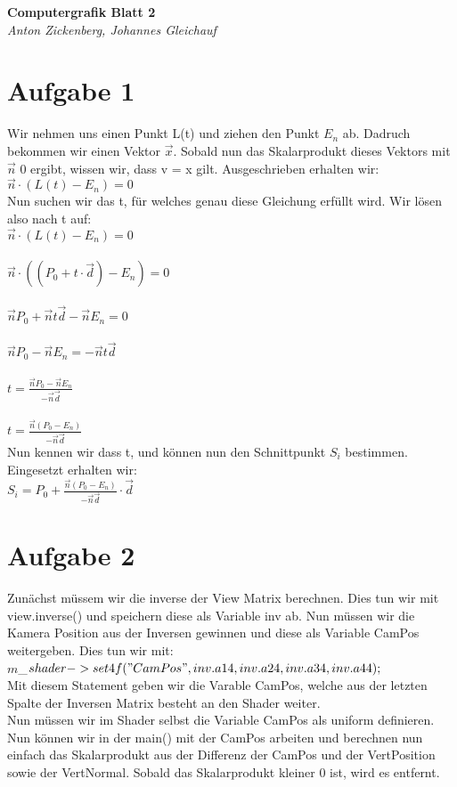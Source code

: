 \documentclass[12pt]{article}
\begin{document}
\begin{center}
 \textbf{\Large Computergrafik Blatt 2}\\
 \emph{Anton Zickenberg, Johannes Gleichauf}
\end{center}

\section*{Aufgabe 1}
Wir nehmen uns einen Punkt L(t) und ziehen den Punkt $E_n$ ab. Dadruch bekommen wir einen Vektor $\overrightarrow{x}$. Sobald nun das Skalarprodukt dieses Vektors mit $\overrightarrow{n}$ 0 ergibt, wissen wir, dass v = x gilt. Ausgeschrieben erhalten wir:\\
$\overrightarrow{n} \cdot (L(t)-E_n) = 0$\\
Nun suchen wir das t, für welches genau diese Gleichung erfüllt wird. Wir lösen also nach t auf:\\
$\overrightarrow{n} \cdot (L(t)-E_n) = 0$\\
\\
$\overrightarrow{n} \cdot ((P_0 + t \cdot \overrightarrow{d})-E_n) = 0$\\
\\
$ \overrightarrow{n}P_0 + \overrightarrow{n}t\overrightarrow{d}-\overrightarrow{n}E_n = 0$\\
\\
$\overrightarrow{n}P_0 -\overrightarrow{n}E_n = -\overrightarrow{n}t\overrightarrow{d}$\\
\\
$t = \frac{\overrightarrow{n}P_0 - \overrightarrow{n}E_n}{-\overrightarrow{n}\overrightarrow{d}}$\\
\\
$t = \frac{\overrightarrow{n}(P_0 - E_n)}{-\overrightarrow{n}\overrightarrow{d}}$\\
Nun kennen wir dass t, und können nun den Schnittpunkt $S_i$ bestimmen. Eingesetzt erhalten wir:\\
$S_i = P_0 + \frac{\overrightarrow{n}(P_0 - E_n)}{-\overrightarrow{n}\overrightarrow{d}} \cdot \overrightarrow{d}$

\section*{Aufgabe 2}
Zunächst müssem wir die inverse der View Matrix berechnen. Dies tun wir mit view.inverse() und speichern diese als Variable inv ab. Nun müssen wir die Kamera Position aus der Inversen gewinnen und diese als Variable CamPos weitergeben. Dies tun wir mit:\\
$m$\_$shader->set4f("CamPos",inv.a14,inv.a24,inv.a34,inv.a44);$\\
Mit diesem Statement geben wir die Varable CamPos, welche aus der letzten Spalte der Inversen Matrix besteht an den Shader weiter.\\
Nun müssen wir im Shader selbst die Variable CamPos als uniform definieren. Nun können wir in der main() mit der CamPos arbeiten und berechnen nun einfach das Skalarprodukt aus der Differenz der CamPos und der VertPosition sowie der VertNormal. Sobald das Skalarprodukt kleiner 0 ist, wird es entfernt.
\end{document}
